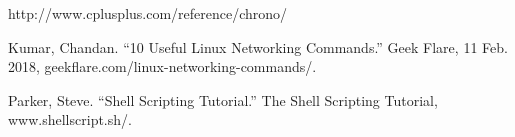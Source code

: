 {\footnotesize
\begin{thebibliography}{99}
	 http://www.cplusplus.com/reference/chrono/
	
	 Kumar, Chandan. “10 Useful Linux Networking Commands.” Geek Flare, 11 Feb. 2018, geekflare.com/linux-networking-commands/. 
	
	  Parker, Steve. “Shell Scripting Tutorial.” The Shell Scripting Tutorial, www.shellscript.sh/. 
\end{thebibliography}
}
